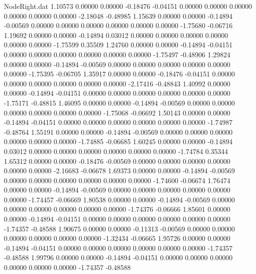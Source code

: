 \begin{filecontents}{NodeRight.dat}
   1.10573    0.00000    0.00000    -0.18476   -0.04151    0.00000    0.00000    0.00000    0.00000    0.00000    0.00000   -2.18048   -0.48985
   1.15639    0.00000    0.00000    -0.14894   -0.00569    0.00000    0.00000    0.00000    0.00000    0.00000    0.00000   -1.75680   -0.06716
   1.19692    0.00000    0.00000    -0.14894    0.03012    0.00000    0.00000    0.00000    0.00000    0.00000    0.00000   -1.75599    0.35509
   1.24760    0.00000    0.00000    -0.14894   -0.04151    0.00000    0.00000    0.00000    0.00000    0.00000    0.00000   -1.75497   -0.48906
   1.29824    0.00000    0.00000    -0.14894   -0.00569    0.00000    0.00000    0.00000    0.00000    0.00000    0.00000   -1.75395   -0.06705
   1.35917    0.00000    0.00000    -0.18476   -0.04151    0.00000    0.00000    0.00000    0.00000    0.00000    0.00000   -2.17416   -0.48843
   1.40992    0.00000    0.00000    -0.14894   -0.04151    0.00000    0.00000    0.00000    0.00000    0.00000    0.00000   -1.75171   -0.48815
   1.46095    0.00000    0.00000    -0.14894   -0.00569    0.00000    0.00000    0.00000    0.00000    0.00000    0.00000   -1.75068   -0.06692
   1.50143    0.00000    0.00000    -0.14894   -0.04151    0.00000    0.00000    0.00000    0.00000    0.00000    0.00000   -1.74987   -0.48764
   1.55191    0.00000    0.00000    -0.14894   -0.00569    0.00000    0.00000    0.00000    0.00000    0.00000    0.00000   -1.74885   -0.06685
   1.60245    0.00000    0.00000    -0.14894    0.03012    0.00000    0.00000    0.00000    0.00000    0.00000    0.00000   -1.74784    0.35344
   1.65312    0.00000    0.00000    -0.18476   -0.00569    0.00000    0.00000    0.00000    0.00000    0.00000    0.00000   -2.16683   -0.06678
   1.69373    0.00000    0.00000    -0.14894   -0.00569    0.00000    0.00000    0.00000    0.00000    0.00000    0.00000   -1.74600   -0.06674
   1.76474    0.00000    0.00000    -0.14894   -0.00569    0.00000    0.00000    0.00000    0.00000    0.00000    0.00000   -1.74457   -0.06669
   1.80538    0.00000    0.00000    -0.14894   -0.00569    0.00000    0.00000    0.00000    0.00000    0.00000    0.00000   -1.74376   -0.06666
   1.85601    0.00000    0.00000    -0.14894   -0.04151    0.00000    0.00000    0.00000    0.00000    0.00000    0.00000   -1.74357   -0.48588
   1.90675    0.00000    0.00000    -0.11313   -0.00569    0.00000    0.00000    0.00000    0.00000    0.00000    0.00000   -1.32434   -0.06665
   1.95726    0.00000    0.00000    -0.14894   -0.04151    0.00000    0.00000    0.00000    0.00000    0.00000    0.00000   -1.74357   -0.48588
   1.99796    0.00000    0.00000    -0.14894   -0.04151    0.00000    0.00000    0.00000    0.00000    0.00000    0.00000   -1.74357   -0.48588

\end{filecontents}
